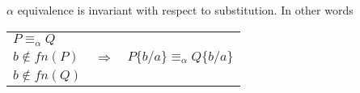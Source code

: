 \begin{lemma}\label{alphaequivalencesubstitution}
  $\alpha$ equivalence is invariant with respect to substitution. In other words 
  \begin{center}
    \begin{tabular}{lll}
	$P\equiv_{\alpha}Q$
      &
	
      &
	
    \\
	$b\notin fn(P)$
      &
	$\Rightarrow$
      &
	$P\{b/a\}\equiv_{\alpha}Q\{b/a\}$
    \\
	$b\notin fn(Q)$
      &
	
      &
	
    \\
    \end{tabular}
  \end{center}

\end{lemma}

